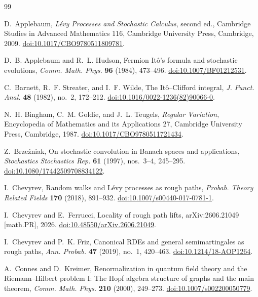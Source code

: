 \documentclass[10pt,reqno]{amsart}
\theoremstyle{plain}
\theoremstyle{definition}
\theoremstyle{remark}
\begin{document}
\begin{thebibliography}{99}

D.~Applebaum,
\emph{L\'evy Processes and Stochastic Calculus}, second ed.,
Cambridge Studies in Advanced Mathematics 116, Cambridge University Press,
Cambridge, 2009.
\href{https://doi.org/10.1017/CBO9780511809781}
{doi:10.1017/CBO9780511809781}.

D.~B. Applebaum and R.~L. Hudson,
Fermion It\^o's formula and stochastic evolutions,
\emph{Comm. Math. Phys.} \textbf{96} (1984), 473--496.
\href{https://doi.org/10.1007/BF01212531}
{doi:10.1007/BF01212531}.

C.~Barnett, R.~F. Streater, and I.~F. Wilde,
The It\^o--Clifford integral,
\emph{J. Funct. Anal.} \textbf{48} (1982), no.~2, 172--212.
\href{https://doi.org/10.1016/0022-1236(82)90066-0}
{doi:10.1016/0022-1236(82)90066-0}.

N.~H. Bingham, C.~M. Goldie, and J.~L. Teugels,
\emph{Regular Variation}, Encyclopedia of Mathematics and its Applications
27, Cambridge University Press, Cambridge, 1987.
\href{https://doi.org/10.1017/CBO9780511721434}
{doi:10.1017/CBO9780511721434}.

Z.~Brze\'zniak,
On stochastic convolution in Banach spaces and applications,
\emph{Stochastics Stochastics Rep.} \textbf{61} (1997), nos.~3--4,
245--295.
\href{https://doi.org/10.1080/17442509708834122}
{doi:10.1080/17442509708834122}.

I.~Chevyrev,
Random walks and L\'evy processes as rough paths,
\emph{Probab. Theory Related Fields} \textbf{170} (2018), 891--932.
\href{https://doi.org/10.1007/s00440-017-0781-1}
{doi:10.1007/s00440-017-0781-1}.

I.~Chevyrev and E.~Ferrucci,
Locality of rough path lifts,
arXiv:2606.21049 [math.PR], 2026.
\href{https://doi.org/10.48550/arXiv.2606.21049}
{doi:10.48550/arXiv.2606.21049}.

I.~Chevyrev and P.~K. Friz,
Canonical RDEs and general semimartingales as rough paths,
\emph{Ann. Probab.} \textbf{47} (2019), no.~1, 420--463.
\href{https://doi.org/10.1214/18-AOP1264}
{doi:10.1214/18-AOP1264}.

A.~Connes and D.~Kreimer,
Renormalization in quantum field theory and the Riemann--Hilbert problem I:
The Hopf algebra structure of graphs and the main theorem,
\emph{Comm. Math. Phys.} \textbf{210} (2000), 249--273.
\href{https://doi.org/10.1007/s002200050779}
{doi:10.1007/s002200050779}.


\end{thebibliography}
\end{document}
